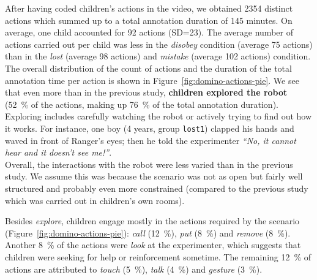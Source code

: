 \documentclass{sig-alternate}
\begin{document}
After having coded children's actions in the video, we obtained 2354 distinct
actions which summed up to a total annotation duration of 145 minutes. On
average, one child accounted for 92 actions (SD=23). The average number of
actions carried out per child was less in the \textit{disobey} condition
(average 75 actions) than in the \textit{lost} (average 98 actions) and
\textit{mistake} (average 102 actions) condition. The overall distribution of
the count of actions and the duration of the total annotation time per action is
shown in Figure~\ref{fig:domino-actions-pie}. We see that even more than in the
previous study, \textbf{children explored the robot} (52~\% of the actions,
making up 76~\% of the total annotation duration). Exploring includes carefully
watching the robot or actively trying to find out how it works. For instance,
one boy (4 years, group \texttt{lost1}) clapped his hands and waved in front of
Ranger's eyes; then he told the experimenter \textit{``No, it cannot hear and it
doesn't see me!''}.\\ 

Overall, the interactions with the robot were less varied than in the previous
study. We assume this was because the scenario was not as open but fairly well
structured and probably even more constrained (compared to the previous study
which was carried out in children's own rooms).


Besides \textit{explore}, children engage mostly in the actions required by the
scenario (Figure~\ref{fig:domino-actions-pie}): \textit{call} (12~\%),
\textit{put} (8~\%) and \textit{remove} (8~\%). Another 8~\% of the actions were
\textit{look} at the experimenter, which suggests that children were seeking for
help or reinforcement sometime. The remaining 12~\% of actions are attributed to
\textit{touch} (5~\%), \textit{talk} (4~\%) and \textit{gesture} (3~\%). 
\end{document}
